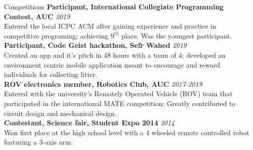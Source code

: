 \documentclass{resume}
\begin{document}
\begin{small}
	\begin{rSection}{Competitions}
		{\bf Participant, International Collegiate Programming Contest, AUC} \hfill {\em 2019} \\
		Entered the local ICPC ACM after gaining experience and practice in competitive programing; achieving $9^{th}$ place. Was the youngest participant. \\
		{\bf Participant, Code Geist hackathon, Sefr Wahed} \hfill {\em 2019} \\
		Created an app and it's pitch in 48 hours with a team of 4; developed an environment centric mobile application meant to encourage and reward individuals for collecting litter.\\
		{\bf ROV electronics member, Robotics Club, AUC} \hfill {\em 2017-2019} \\
		Entered with the university's Remotely Operated Vehicle (ROV) team that participated in the international MATE competition; Greatly contributed to circuit design and mechanical design. \\
		{\bf Contestant, Science fair, Student Expo 2014} \hfill {\em 2014} \\
		Won first place at the high school level with a 4 wheeled remote controlled robot featuring a 3-axis arm.
	\end{rSection}
	

\end{small}
\end{document}
